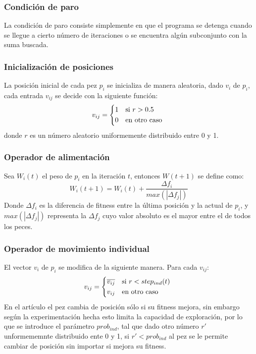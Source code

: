 \documentclass[12pt]{article}
\begin{document}
\subsubsection{Condición de paro}
La condición de paro consiste simplemente en que el programa se detenga cuando se llegue a cierto número de iteraciones o se encuentra algún subconjunto con la suma buscada.

\subsubsection{Inicialización de posiciones}
La posición inicial de cada pez $p_i$ se inicializa de manera aleatoria, dado $v_i$ de $p_i$, cada entrada $v_{ij}$ se decide con la siguiente función:
\begin{equation*}
  v_{ij} =
  \begin{cases*}
      1 & si $r > 0.5$ \\
      0 & en otro caso 
    \end{cases*}
\end{equation*}
donde $r$ es un número aleatorio uniformemente distribuido entre 0 y 1.

\subsubsection{Operador de alimentación}
Sea $W_i(t)$ el peso de $p_i$ en la iteración $t$, entonces $W(t + 1)$ se define como:
\begin{equation*}
  W_i(t + 1) = W_i(t) + \frac{\Delta f_i}{max(|\Delta f_j|)}
\end{equation*}
Donde $\Delta f_i$ es la diferencia de fitness entre la última posición y la actual de $p_i$, y $max(|\Delta f_j|)$ representa la $\Delta f_j$ cuyo valor absoluto es el mayor entre el de todos los peces.

\subsubsection{Operador de movimiento individual}
El vector $v_i$ de $p_i$ se modifica de la siguiente manera. Para cada $v_{ij}$:
\begin{equation*}
  v_{ij} =
  \begin{cases*}
    \overline{v_{ij}} & si $r < step_{ind}(t)$ \\
    v_{ij} & en otro caso 
  \end{cases*}
\end{equation*}
En el artículo el pez cambia de posición sólo si su fitness mejora, sin embargo según la experimentación hecha esto limita la capacidad de exploración, por lo que se introduce el parámetro $prob_{ind}$, tal que dado otro número $r'$ unformememnte distribuido ente 0 y 1, si $r' < prob_{ind}$ al pez se le permite cambiar de posición sin importar si mejora su fitness. \\
\end{document}
